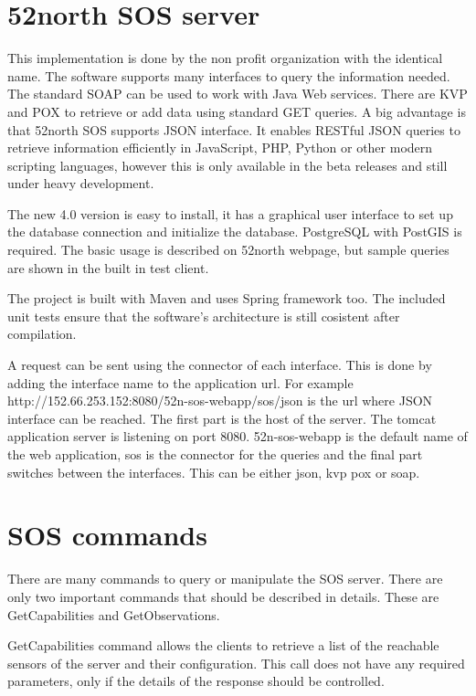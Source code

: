 \section{52north SOS server}

This implementation is done by the non profit organization with the identical name. The software supports many interfaces to query the information needed. The standard SOAP can be used to work with Java Web services. There are KVP and POX to retrieve or add data using standard GET queries. A big advantage is that 52north SOS supports JSON interface. It enables RESTful JSON queries to retrieve information efficiently in JavaScript, PHP, Python or other modern scripting languages, however this is only available in the beta releases and still under heavy development.

The new 4.0 version is easy to install, it has a graphical user interface to set up the database connection and initialize the database. PostgreSQL with PostGIS is required.  The basic usage is described on  52north webpage, but sample queries are shown in the built in test client. 

The project is built with Maven and uses Spring framework too. The included unit tests ensure that the software's architecture is still cosistent after compilation.

A request can be sent using the connector of each interface. This is done by adding the interface name to the application url. For example http://152.66.253.152:8080/52n-sos-webapp/sos/json is the url where JSON interface can be reached. The first part is the host of the server. The tomcat application server is listening on port 8080. 52n-sos-webapp is the default name of the web application, sos is the connector for the queries and the final part switches between the interfaces. This can be either json, kvp pox or soap.

\section{SOS commands}
There are many commands to query or manipulate the SOS server. There are only two important commands that should be described in details. These are GetCapabilities and GetObservations.

GetCapabilities command allows the clients to retrieve a list of the reachable sensors of the server and their configuration. This call does not have any required parameters, only if the details of the response should be controlled.

